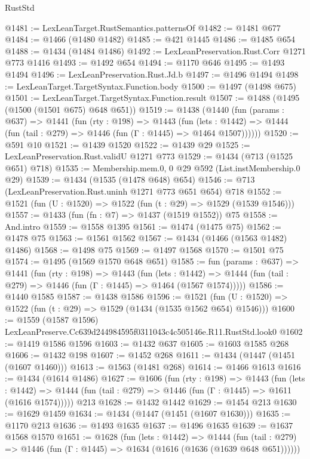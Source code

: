 \begin{lexlean}{RustStd}
\begin{coremodule}
@1481 := LexLeanTarget.RustSemantics.patternsOf
@1482 := @1481 @677
@1484 := @1466 (@1480 @1482)
@1485 := @421 @1445
@1486 := @1485 @654
@1488 := @1434 (@1484 @1486)
@1492 := LexLeanPreservation.Rust.Corr @1271 @773 @1416
@1493 := @1492 @654
@1494 := @1170 @646
@1495 := @1493 @1494
@1496 := LexLeanPreservation.Rust.Jd.b
@1497 := @1496 @1494
@1498 := LexLeanTarget.TargetSyntax.Function.body
@1500 := @1497 (@1498 @675)
@1501 := LexLeanTarget.TargetSyntax.Function.result
@1507 := @1488 (@1495 (@1500 (@1501 @675) @648 @651))
@1519 := @1438
    (@1440
      (fun (params : @637) =>
      @1441
        (fun (rty : @198) =>
        @1443
          (fun (lets : @1442) =>
          @1444 (fun (tail : @279) => @1446 (fun (Γ : @1445) => @1464 @1507))))))
@1520 := @591 @10
@1521 := @1439 @1520
@1522 := @1439 @29
@1525 := LexLeanPreservation.Rust.validU @1271 @773
@1529 := @1434 (@713 (@1525 @651) @718)
@1535 := Membership.mem.{0, 0} @29 @592 (List.instMembership.{0} @29)
@1539 := @1434 (@1535 (@1478 @648) @654)
@1546 := @713 (LexLeanPreservation.Rust.uninh @1271 @773 @651 @654) @718
@1552 := @1521 (fun (U : @1520) => @1522 (fun (t : @29) => @1529 (@1539 @1546)))
@1557 := @1433 (fun (fn : @7) => @1437 (@1519 @1552)) @75
@1558 := And.intro
@1559 := @1558 @1395
@1561 := @1474 (@1475 @75)
@1562 := @1478 @75
@1563 := @1561 @1562
@1567 := @1434 (@1466 (@1563 @1482) @1486)
@1568 := @1498 @75
@1569 := @1497 @1568
@1570 := @1501 @75
@1574 := @1495 (@1569 @1570 @648 @651)
@1585 := fun (params : @637) =>
  @1441
    (fun (rty : @198) =>
    @1443
      (fun (lets : @1442) =>
      @1444 (fun (tail : @279) => @1446 (fun (Γ : @1445) => @1464 (@1567 @1574)))))
@1586 := @1440 @1585
@1587 := @1438 @1586
@1596 := @1521 (fun (U : @1520) => @1522 (fun (t : @29) => @1529 (@1434 (@1535 @1562 @654) @1546)))
@1600 := @1559 (@1587 @1596) LexLeanPreserve.Cc639d244984595f0311043c4c505146e.R11.RustStd.look0
@1602 := @1419 @1586 @1596
@1603 := @1432 @637
@1605 := @1603 @1585 @268
@1606 := @1432 @198
@1607 := @1452 @268
@1611 := @1434 (@1447 (@1451 (@1607 @1460)))
@1613 := @1563 (@1481 @268)
@1614 := @1466 @1613
@1616 := @1434 (@1614 @1486)
@1627 := @1606
    (fun (rty : @198) =>
    @1443
      (fun (lets : @1442) =>
      @1444 (fun (tail : @279) => @1446 (fun (Γ : @1445) => @1611 (@1616 @1574)))))
    @213
@1628 := @1432 @1442
@1629 := @1454 @213
@1630 := @1629 @1459
@1634 := @1434 (@1447 (@1451 (@1607 @1630)))
@1635 := @1170 @213
@1636 := @1493 @1635
@1637 := @1496 @1635
@1639 := @1637 @1568 @1570
@1651 := @1628
    (fun (lets : @1442) =>
    @1444 (fun (tail : @279) => @1446 (fun (Γ : @1445) => @1634 (@1616 (@1636 (@1639 @648 @651))))))

\end{coremodule}
\end{lexlean}
